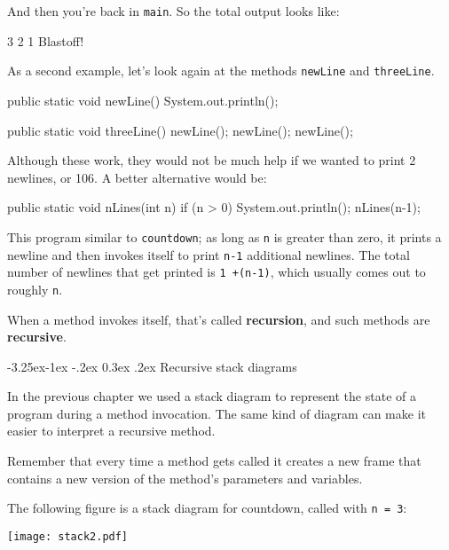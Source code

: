 \documentclass[12pt]{book}
\makeatletter
\renewcommand\subsection{\@startsection{subsection}{2}{\z@}%
    {-3.25ex\@plus -1ex \@minus -.2ex}%
    {0.3ex \@plus .2ex}%
    {\normalfont\large\bfseries}}
\theoremstyle{exercise}
\makeatother
\begin{document}
\noindent And then you're back in {\tt main}.
So the total output looks like:

\begin{stdout}
3
2
1
Blastoff!
\end{stdout}

As a second example, let's look again at the methods {\tt newLine} and {\tt threeLine}.

\begin{code}
    public static void newLine() {
        System.out.println();
    }

    public static void threeLine() {
        newLine();
        newLine();
        newLine();
    }
\end{code}

Although these work, they would not be much help if we wanted to print 2 newlines, or 106.
A better alternative would be:

\begin{code}
    public static void nLines(int n) {
        if (n > 0) {
            System.out.println();
            nLines(n-1);
        }
    }
\end{code}

This program similar to {\tt countdown}; as long as {\tt n} is greater than zero, it prints a newline and then invokes itself to print {\tt n-1} additional newlines.
The total number of newlines that get printed is {\tt 1 +(n-1)}, which usually comes out to roughly {\tt n}.


When a method invokes itself, that's called {\bf recursion}, and such methods are {\bf recursive}.

\subsection{Recursive stack diagrams}


In the previous chapter we used a stack diagram to represent the state of a program during a method invocation.
The same kind of diagram can make it easier to interpret a recursive method.

Remember that every time a method gets called it creates a new frame that contains a new version of the method's parameters and variables.

The following figure is a stack diagram for countdown, called with {\tt n = 3}:

\begin{center}
\texttt{[image: stack2.pdf]}
\end{center}
\end{document}
